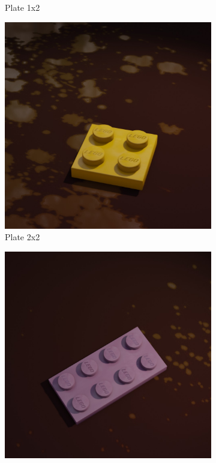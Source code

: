 \documentclass[]{article}
\begin{document}
\begin{figure}[h]
\begin{subfigure}[b]{0.15\textwidth}
        \caption{Plate 1x2}
    \end{subfigure}
    \begin{subfigure}[b]{0.15\textwidth}
        \centering
        \includegraphics[width=\textwidth]{Examples/plate-2x2.jpg}
        \caption{Plate 2x2}
    \end{subfigure}
    \begin{subfigure}[b]{0.15\textwidth}
        \centering
        \includegraphics[width=\textwidth]{Examples/plate-2x4.jpg}

\end{subfigure}
\end{figure}
\end{document}
